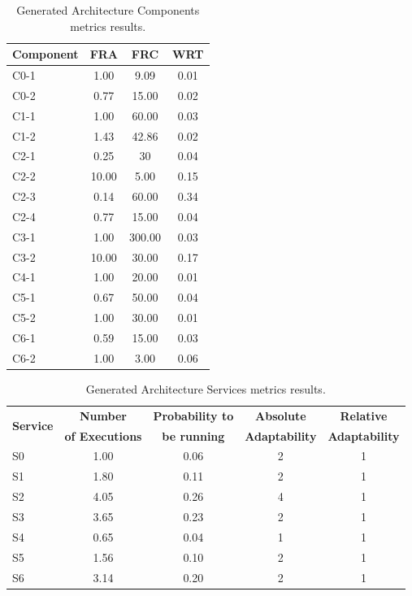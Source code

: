 \begin{table}[ht!b]
	\centering
	\begin{tabular}{|l|c|c|c|}
		\hline 
		\textbf{Component} & \textbf{FRA} & \textbf{FRC} & \textbf{WRT} \\ 
		\hline 
		C0-1 & 1.00 & 9.09 & 0.01 \\
		\hline 
		C0-2 & 0.77 & 15.00 & 0.02 \\
		\hline 
		C1-1 & 1.00 & 60.00 & 0.03 \\
		\hline 
		C1-2 & 1.43 & 42.86 & 0.02 \\
		\hline
		C2-1 & 0.25 & 30 & 0.04 \\
		\hline
		C2-2 & 10.00 & 5.00 & 0.15 \\
		\hline
		C2-3 & 0.14 & 60.00 & 0.34 \\
		\hline
		C2-4 & 0.77 & 15.00 & 0.04 \\
		\hline
		C3-1 & 1.00 & 300.00 & 0.03 \\
		\hline
		C3-2 & 10.00 & 30.00 & 0.17 \\
		\hline
		C4-1 & 1.00 & 20.00 & 0.01 \\
		\hline
		C5-1 & 0.67 & 50.00 & 0.04 \\
		\hline
		C5-2 & 1.00 & 30.00 & 0.01 \\
		\hline
		C6-1 & 0.59 & 15.00 & 0.03 \\
		\hline
		C6-2 & 1.00 & 3.00 & 0.06 \\
		\hline
	\end{tabular} 
	\caption[Generated Architecture Service Components Metrics]{Generated Architecture Components metrics results.}
	\label{tab:ag-comp-res}
\end{table}

\begin{table}[ht!b]
	\centering
	\begin{tabular}{|l|c|c|c|c|}
		\hline 
		\multirow{2}{*}{\textbf{Service}} & \textbf{Number} & \textbf{Probability to} & \textbf{Absolute} & \textbf{Relative} \\ 
		& \textbf{of Executions} & \textbf{be running} & \textbf{Adaptability} & \textbf{Adaptability} \\
		\hline 
		S0 & 1.00 & 0.06 & 2 & 1 \\
		\hline 
		S1 & 1.80 & 0.11 & 2 & 1 \\
		\hline 
		S2 & 4.05 & 0.26 & 4 & 1 \\
		\hline 
		S3 & 3.65 & 0.23 & 2 & 1 \\
		\hline
		S4 & 0.65 & 0.04 & 1 & 1 \\
		\hline
		S5 & 1.56 & 0.10 & 2 & 1 \\
		\hline
		S6 & 3.14 & 0.20 & 2 & 1 \\
		\hline
	\end{tabular} 
	\caption[Generated Architecture Service Services Metrics]{Generated Architecture Services metrics results.}
	\label{tab:ag-serv-res}
\end{table}


